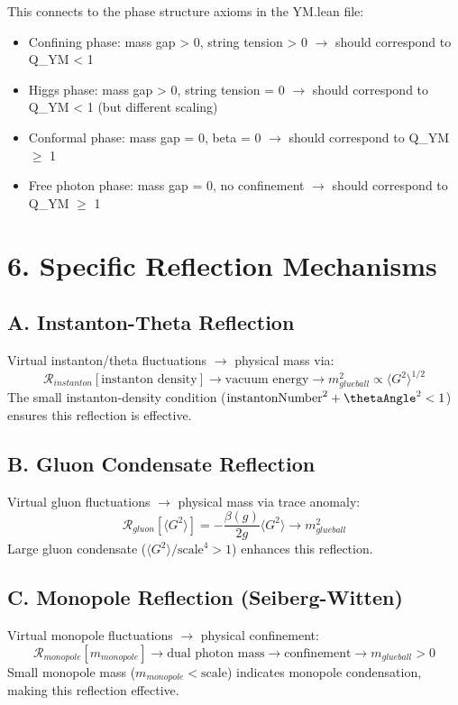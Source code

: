 \documentclass[11pt]{article}
\begin{document}
This connects to the phase structure axioms in the YM.lean file:
\begin{itemize}
\item Confining phase: mass gap > 0, string tension > 0 $\rightarrow$ should correspond to Q_YM < 1
\item Higgs phase: mass gap > 0, string tension = 0 $\rightarrow$ should correspond to Q_YM < 1 (but different scaling)
\item Conformal phase: mass gap = 0, beta = 0 $\rightarrow$ should correspond to Q_YM $\geq$ 1
\item Free photon phase: mass gap = 0, no confinement $\rightarrow$ should correspond to Q_YM $\geq$ 1
\end{itemize}

\section{6. Specific Reflection Mechanisms}

\subsection{A. Instanton-Theta Reflection}
Virtual instanton/theta fluctuations $\rightarrow$ physical mass via:
\[
\mathcal{R}_{instanton}[\text{instanton density}] \rightarrow \text{vacuum energy} \rightarrow m_{glueball}^2 \propto \langle G^2 \rangle^{1/2}
\]
The small instanton-density condition ($\text{instantonNumber}^2 + \thetaAngle^2 < 1$) ensures this reflection is effective.

\subsection{B. Gluon Condensate Reflection}
Virtual gluon fluctuations $\rightarrow$ physical mass via trace anomaly:
\[
\mathcal{R}_{gluon}[\langle G^2 \rangle] = -\frac{\beta(g)}{2g} \langle G^2 \rangle \rightarrow m_{glueball}^2
\]
Large gluon condensate ($\langle G^2 \rangle / \text{scale}^4 > 1$) enhances this reflection.

\subsection{C. Monopole Reflection (Seiberg-Witten)}
Virtual monopole fluctuations $\rightarrow$ physical confinement:
\[
\mathcal{R}_{monopole}[m_{monopole}] \rightarrow \text{dual photon mass} \rightarrow \text{confinement} \rightarrow m_{glueball} > 0
\]
Small monopole mass ($m_{monopole} < \text{scale}$) indicates monopole condensation, making this reflection effective.
\end{document}
